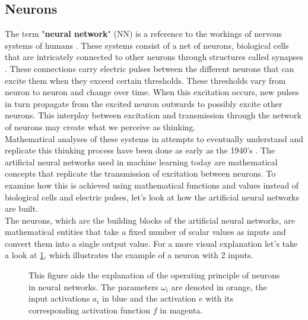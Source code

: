 \subsection{Neurons}
The term "\textbf{neural network}" (NN) is a reference to the workings of nervous systems of humans \cite{NeuralNetworkLiteratureReview}. These systems consist of a net of neurons, biological cells that are intricately connected to other neurons through structures called synapses \cite{PrinciplesOfBrainFunctioningHaken}. These connections carry electric pulses between the different neurons that can excite them when they exceed certain thresholds. These thresholds vary from neuron to neuron and change over time. When this excitation occurs, new pulses in turn propagate from the excited neuron outwards to possibly excite other neurons. This interplay between excitation and transmission through the network of neurons may create what we perceive as thinking.\\
Mathematical analyses of these systems in attempts to eventually understand and replicate this thinking process have been done as early as the 1940's \cite{A_logical_calculus_of_the_ideas_immanent_in_nervous_activity}. The artificial neural networks used in machine learning today are mathematical concepts that replicate the transmission of excitation between neurons. To examine how this is achieved using mathematical functions and values instead of biological cells and electric pulses, let's look at how the artificial neural networks are built.\\
The neurons, which are the building blocks of the artificial neural networks, are mathematical entities that take a fixed number of scalar values as inputs and convert them into a single output value. For a more visual explanation let's take a look at \cref{fig:Neuron_explanation}, which illustrates the example of a neuron with 2 inputs.
\begin{figure}
	\centering
	
	\caption{This figure aids the explanation of the operating principle of neurons in neural networks. The parameters $\omega_i$ are denoted in orange, the input activations $a_i$ in blue and the activation $e$ with its corresponding activation function $f$ in magenta.}
	\label{fig:Neuron_explanation}
\end{figure}
